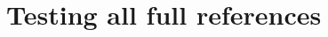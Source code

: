 \documentclass{article}
\begin{document}
\section*{Testing all full references}





\end{document}
